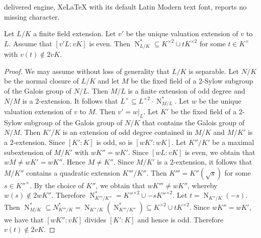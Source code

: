 \documentclass[10pt,a4paper]{amsart}
\newcommand\N{\operatorname{N}}
\newcommand{\mg}[1]{{#1}^{\times}}
\newcommand{\sq}[1]{{#1}^{\times 2}}
\begin{document}
delivered engine, XeLaTeX with its default Latin Modern text font, reports no missing character.
\begin{lem}\label{L:even-ramified-norms}
    Let $L/K$ a finite field extension.
    Let $v'$ be the unique valuation extension of $v$ to $L$.
    Assume that $[v'L:vK]$ is even. 
    Then 
    $\N_{L/K}^\ast\subseteq\sq{K}\cup t\sq{K}$ for some  $t\in \mg{K}$ with $v(t)\notin 2vK$.
\end{lem}

\begin{proof}
We may assume without loss of generality that $L/K$ is separable.
Let $N/K$ be the normal closure of $L/K$ and let $M$ be the fixed field of a $2$-Sylow subgroup of the Galois group of $N/L$. 
Then $M/L$ is a finite extension of odd degree and $N/M$ is a $2$-extension. 
It follows that $\mg{L}\subseteq \sq{L}\cdot \N_{M/L}^\ast$.
Let $w$ be the unique valuation extension of $v$ to $M$.
Then $v'=w|_L$.
Let $K'$ be the fixed field of a $2$-Sylow subgroup of the Galois group of $N/K$ that contains the Galois group of $N/M$.
Then $K'/K$ is an extension of odd degree contained in $M/K$ and $M/K'$ is a $2$-extension.
Since $[K':K]$ is odd, so is $[wK':wK]$.
Let $K''/K'$ be a maximal subextension of $M/K'$ with $wK''=wK'$.
    Since $[wL:vK]$ is even, we obtain that $wM\neq wK'=wK''$.
    Hence $M\neq K''$. Since $M/K'$ is a $2$-extension, it follows that $M/K''$ contains a quadratic extension $K'''/K''$.
    Then $K'''=K''(\sqrt{s})$ for some $s\in \mg{K''}$.
    By the choice of $K''$, we obtain that $wK'''\neq wK''$,
    whereby $w(s)\notin 2wK''$.
    Therefore $\N_{K'''/K''}^\ast= \sq{K''}\cup -s\sq{K''}$.
    Let $t=\N_{K''/K}(-s)$.
    Then $\N_{M/K}^\ast\subseteq 
    N_{K'''/K}^\ast=\N_{K''/K}(\N_{K'''/K''}^\ast)\subseteq\sq{K}\cup t\sq{K}$.
    Since $wK''=wK'$, we have that $[wK'':vK]$ divides $[K':K]$ and hence is odd.
    Therefore $v(t)\notin 2vK$.
\end{proof}
\end{document}
